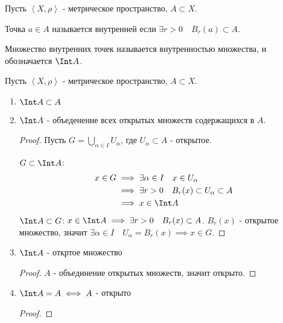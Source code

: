 
\begin{definition}[повтор] \thmslashn 

    Пусть $\left<X, \rho\right>$ - метрическое пространство, $A \subset X$.

    Точка $a\in A$ называется внутренней если $\exists{r > 0}\quad B_{r}(a) \subset A$.

    Множество внутренних точек называется внутренностью множества, и обозначается $\Int A$.
\end{definition}

\begin{properties} \thmslashn

    Пусть $\left<X, \rho\right>$ - метрическое пространство, $A \subset X$.

    \begin{enumerate}
        \item $\Int A \subset A$
        \item $\Int A$ - объеденение всех открытых множеств содержащихся в $A$.
            \begin{proof} \thmslashn
            
                Пусть $G = \bigcup\limits_{\alpha\in I} U_{\alpha}$, где $U_{\alpha} \subset A$ - открытое.

                $G \subset \Int A$:
                \begin{equation*}
                    \begin{split}
                        x\in G 
                        &\implies \exists{\alpha\in I}\quad x\in U_{\alpha}\\
                        &\implies \exists{r > 0}\quad B_{r}(x) \subset U_{\alpha} \subset A\\
                        &\implies x\in \Int A
                    \end{split}
                \end{equation*}
                $\Int A \subset G$:  $x\in \Int A \implies \exists{r > 0}\quad B_{r}(x) \subset A$. $B_{r}(x)$ - открытое множество, значит $\exists{\alpha\in I}\quad U_{\alpha} = B_{r}(x) \implies x\in G$.
            \end{proof}
        \item $\Int A$ - откртое множество
            \begin{proof} \thmslashn
            
                $A$ - объединение открытых множеств, значит открыто.
            \end{proof}
        \item $\Int A = A \iff A$ - открыто
            \begin{proof} \thmslashn
            

\end{proof}
\end{enumerate}
\end{properties}
